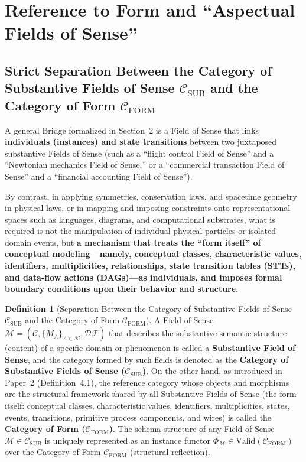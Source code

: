 \documentclass[11pt,a4paper]{article}
\theoremstyle{definition}
\newtheorem{definition}{Definition}[section]
\theoremstyle{plain}
\theoremstyle{remark}
\newcommand{\Valid}{\mathrm{Valid}}
\newcommand{\CFORM}{\mathcal{C}_{\mathrm{FORM}}}
\newcommand{\CSUB}{\mathcal{C}_{\mathrm{SUB}}}
\begin{document}
\section{Reference to Form and ``Aspectual Fields of Sense''}

\subsection{Strict Separation Between the Category of Substantive Fields of Sense $\CSUB$ and the Category of Form $\CFORM$}
A general Bridge formalized in Section~2 is a Field of Sense that links \textbf{individuals (instances) and state transitions} between two juxtaposed substantive Fields of Sense (such as a ``flight control Field of Sense'' and a ``Newtonian mechanics Field of Sense,'' or a ``commercial transaction Field of Sense'' and a ``financial accounting Field of Sense'').

By contrast, in applying symmetries, conservation laws, and spacetime geometry in physical laws, or in mapping and imposing constraints onto representational spaces such as languages, diagrams, and computational substrates, what is required is not the manipulation of individual physical particles or isolated domain events, but \textbf{a mechanism that treats the ``form itself'' of conceptual modeling---namely, conceptual classes, characteristic values, identifiers, multiplicities, relationships, state transition tables (STTs), and data-flow actions (DAGs)---as individuals, and imposes formal boundary conditions upon their behavior and structure}.

\begin{definition}[Separation Between the Category of Substantive Fields of Sense $\CSUB$ and the Category of Form $\CFORM$]\label{def:sub-vs-form}
A Field of Sense $\mathcal{M} = (\mathcal{C}, \{M_A\}_{A \in \mathcal{K}}, \mathcal{DF})$ that describes the substantive semantic structure (content) of a specific domain or phenomenon is called a \textbf{Substantive Field of Sense}, and the category formed by such fields is denoted as the \textbf{Category of Substantive Fields of Sense ($\CSUB$)}. On the other hand, as introduced in Paper~2 (Definition~4.1), the reference category whose objects and morphisms are the structural framework shared by all Substantive Fields of Sense (the form itself: conceptual classes, characteristic values, identifiers, multiplicities, states, events, transitions, primitive process components, and wires) is called the \textbf{Category of Form ($\CFORM$)}. The schema structure of any Field of Sense $\mathcal{M} \in \CSUB$ is uniquely represented as an instance functor $\Phi_{\mathcal{M}} \in \Valid(\CFORM)$ over the Category of Form $\CFORM$ (structural reflection).
\end{definition}
\end{document}
